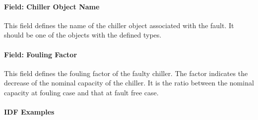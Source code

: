 \paragraph{Field: Chiller Object Name}\label{field-chiller-object-name}

This field defines the name of the chiller object associated with the fault. It should be one of the objects with the defined types.

\paragraph{Field: Fouling Factor}\label{field-fouling-factor}

This field defines the fouling factor of the faulty chiller. The factor indicates the decrease of the nominal capacity of the chiller. It is the ratio between the nominal capacity at fouling case and that at fault free case.

\paragraph{IDF Examples}

